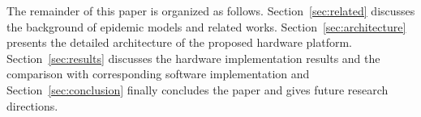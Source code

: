 The remainder of this paper is organized as follows. Section~\ref{sec:related} discusses the background of epidemic models and related works. Section~\ref{sec:architecture} presents the detailed architecture of the proposed hardware platform. Section~\ref{sec:results} discusses the hardware implementation results and the comparison with corresponding software implementation and Section~\ref{sec:conclusion} finally concludes the paper and gives future research directions.
